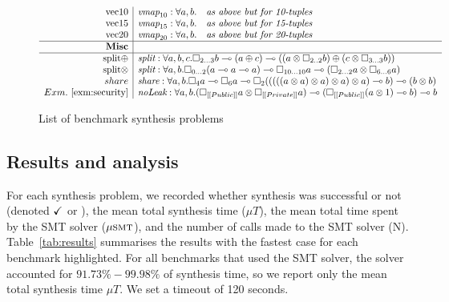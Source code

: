 {{\begin{figure}
\begin{align*}
\begin{array}{r|rll}
\text{vec10} & \textit{vmap}_{10} : \forall a, b . & \textit{as above but for 10-tuples} \\
\text{vec15} & \textit{vmap}_{15} : \forall a, b . & \textit{as above but for 15-tuples} \\
\text{vec20} & \textit{vmap}_{20} : \forall a, b . & \textit{as above but for 20-tuples}\\ \hline
\textbf{Misc} \\ \hline
\text{split$\oplus$} & \multicolumn{2}{l}{ \textit{split} : \forall a, b, c .
\Box_{2...3} b \multimap (a \oplus c) \multimap (( a \otimes \Box_{2..2} b) \oplus (c \otimes \Box_{3...3} b))}
 \\
\text{split$\otimes$} & \multicolumn{2}{l}{\textit{split} : \forall a, b . 
\Box_{0...2} (a \multimap a \multimap a) \multimap \Box_{10...10} a \multimap (\Box_{2...2} a \otimes \Box_{6...6} a) 
}
\\
share & \multicolumn{2}{l}{\textit{share} : \forall a, b .  \Box_4 a \multimap \Box_6 a \multimap \Box_2 ((((( a \otimes a) \otimes a) \otimes a) \otimes a) \multimap b) \multimap (b \otimes b)}
\\
Exm.~\ref{exm:security}
& \multicolumn{2}{l}{\textit{noLeak} : \forall a, b . (\Box_{[[ Public ]]} a \otimes \Box_{[[ Private]]} a) \multimap (\Box_{[[ Public ]]}(a \otimes 1) \multimap b) \multimap b }
\end{array}
\end{align*}
\label{fig:list-of-types}
\caption{List of benchmark synthesis problems}
\end{figure}
}}





\subsection{Results and analysis}
%
For each synthesis problem, we recorded whether synthesis
was successful or not (denoted $\checkmark$ or \fail), the mean
total synthesis time ($\mu{T}$), the mean total time spent by
the SMT solver ($\mu\textsc{smt}$), and the number of
calls made to the SMT solver (\textsc{N}).
Table~\ref{tab:results} summarises the results with the fastest case for each
benchmark highlighted.
For all benchmarks that used
the SMT solver, the solver accounted for $91.73\%-99.98\%$
of synthesis time, so we report only the mean
total synthesis time $\mu{T}$. %
We set a timeout of 120 seconds.


